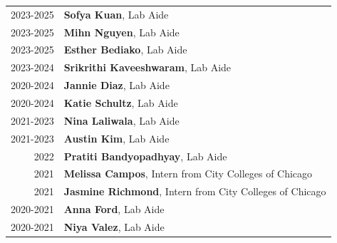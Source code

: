 \documentclass[12pt,reqno,oneside]{report}
\begin{document}
\begin{table}[h]
    \raggedright
    \begin{tabular}{rl}
        2023-2025 & \textbf{Sofya Kuan}, Lab Aide \\
        2023-2025 & \textbf{Mihn Nguyen}, Lab Aide \\
        2023-2025 & \textbf{Esther Bediako}, Lab Aide \\
        2023-2024 & \textbf{Srikrithi Kaveeshwaram}, Lab Aide \\
        2020-2024 & \textbf{Jannie Diaz}, Lab Aide \\
        2020-2024 & \textbf{Katie Schultz}, Lab Aide \\
        2021-2023 & \textbf{Nina Laliwala}, Lab Aide \\
        2021-2023 & \textbf{Austin Kim}, Lab Aide \\
        2022 & \textbf{Pratiti Bandyopadhyay}, Lab Aide \\
        2021 & \textbf{Melissa Campos}, Intern from City Colleges of Chicago \\
        2021 & \textbf{Jasmine Richmond}, Intern from City Colleges of Chicago \\
        2020-2021 & \textbf{Anna Ford}, Lab Aide \\
        2020-2021 & \textbf{Niya Valez}, Lab Aide \\
    \end{tabular}
\end{table}
\end{document}
